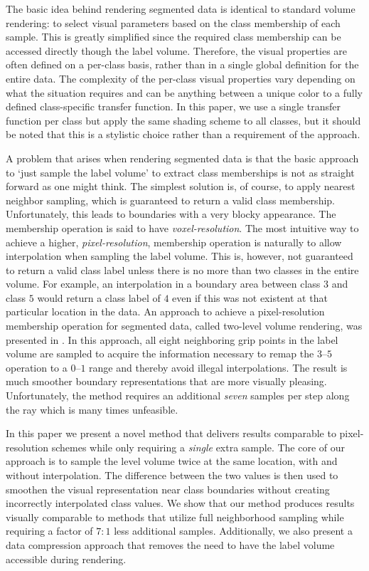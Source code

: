 \documentclass{egpubl}
\begin{document}
The basic idea behind rendering segmented data is identical to standard volume rendering: to select visual parameters based on the class membership of each sample. This is greatly simplified since the required class membership can be accessed directly though the label volume. Therefore, the visual properties are often defined on a per-class basis, rather than in a single global definition for the entire data. The complexity of the per-class visual properties vary depending on what the situation requires and can be anything between a unique color to a fully defined class-specific transfer function. In this paper, we use a single transfer function per class but apply the same shading scheme to all classes, but it should be noted that this is a stylistic choice rather than a requirement of the approach.

A problem that arises when rendering segmented data is that the basic approach to `just sample the label volume' to extract class memberships is not as straight forward as one might think. The simplest solution is, of course, to apply nearest neighbor sampling, which is guaranteed to return a valid class membership. Unfortunately, this leads to boundaries with a very blocky appearance. The membership operation is said to have \emph{voxel-resolution}. The most intuitive way to achieve a higher, \emph{pixel-resolution}, membership operation is naturally to allow interpolation when sampling the label volume. This is, however, not guaranteed to return a valid class label unless there is no more than two classes in the entire volume. For example, an interpolation in a boundary area between class $3$ and class $5$ would return a class label of $4$ even if this was not existent at that particular location in the data. An approach to achieve a pixel-resolution membership operation for segmented data, called two-level volume rendering, was presented in \cite{Hadwiger2003}. In this approach, all eight neighboring grip points in the label volume are sampled to acquire the information necessary to remap the $3$--$5$ operation to a $0$--$1$ range and thereby avoid illegal interpolations. The result is much smoother boundary representations that are more visually pleasing. Unfortunately, the method requires an additional \emph{seven} samples per step along the ray which is many times unfeasible.

In this paper we present a novel method that delivers results comparable to pixel-resolution schemes while only requiring a \emph{single} extra sample. The core of our approach is to sample the level volume twice at the same location, with and without interpolation. The difference between the two values is then used to smoothen the visual representation near class boundaries without creating incorrectly interpolated class values. We show that our method produces results visually comparable to methods that utilize full neighborhood sampling while requiring a factor of $7:1$ less additional samples. Additionally, we also present a data compression approach that removes the need to have the label volume accessible during rendering.
\end{document}
